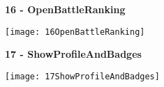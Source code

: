 \begin{minipage}{\textwidth}
	\textbf{16 - OpenBattleRanking}
	\begin{center}
		\texttt{[image: 16OpenBattleRanking]}
	\end{center}
\end{minipage}

\begin{minipage}{\textwidth}
	\textbf{17 - ShowProfileAndBadges}
	\begin{center}
		\texttt{[image: 17ShowProfileAndBadges]}
	\end{center}
\end{minipage}